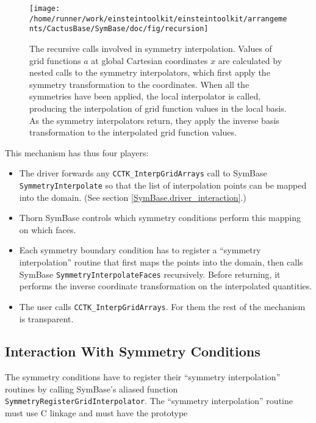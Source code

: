 \begin{figure}[tb]
\begin{center}
\texttt{[image: /home/runner/work/einsteintoolkit/einsteintoolkit/arrangements/CactusBase/SymBase/doc/fig/recursion]}
\end{center}
\caption[Symmetry interpolation] {
	  The recursive calls involved in symmetry interpolation.
	  Values of grid functions $a$ at global Cartesian coordinates $x$ are 
	  calculated by nested calls to the symmetry interpolators, which first
	  apply the symmetry transformation to the coordinates.  When all
	  the symmetries have been applied, the local interpolator is called,
	  producing the interpolation of grid function values in the local basis.
	  As the symmetry interpolators return, they apply the inverse basis
	  transformation to the interpolated grid function values.
}
\label{SymBase.recursion}
\end{figure}

This mechanism has thus four players:
\begin{itemize}
	\item The driver forwards any \texttt{CCTK\_InterpGridArrays} call
	  to SymBase \texttt{SymmetryInterpolate} so that the list of
	  interpolation points can be mapped into the domain. (See section
	  \ref{SymBase.driver_interaction}.)
	\item Thorn SymBase controls which symmetry conditions perform this
	  mapping on which faces.
	\item Each symmetry boundary condition has to register a ``symmetry
	  interpolation'' routine that first maps the points into the domain,
	  then calls SymBase \texttt{SymmetryInterpolateFaces} recursively.
	  Before returning, it performs the inverse coordinate transformation
	  on the interpolated quantities.
	\item The user calls \texttt{CCTK\_InterpGridArrays}.  For them
	  the rest of the mechanism is transparent.
\end{itemize}



\subsection{Interaction With Symmetry Conditions}

The symmetry conditions have to register their ``symmetry
interpolation'' routines by calling SymBase's aliased function
\texttt{SymmetryRegisterGridInterpolator}.  The ``symmetry
interpolation'' routine must use C linkage and must have the prototype

